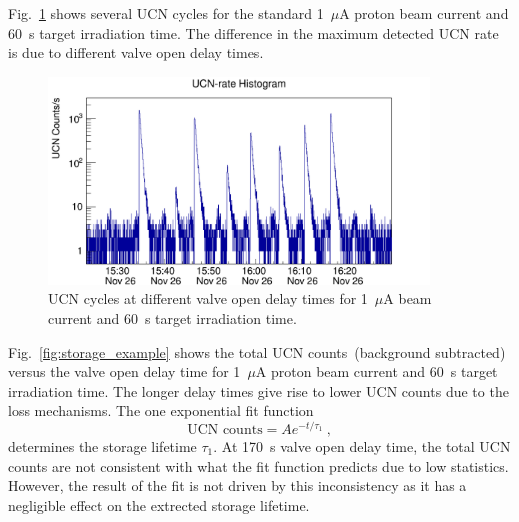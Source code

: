 Fig.~\ref{fig:storage_all} shows several UCN cycles for the standard
1~$\mu$A proton beam current and 60~s target irradiation time. The
difference in the maximum detected UCN rate is due to different valve
open delay times.
\begin{figure}[h!]
  \centering
  \includegraphics[width=0.9\textwidth]{storagetime_all.png}
  \caption{UCN cycles at different valve open delay times for 1~$\mu$A
    beam current and 60~s target irradiation time.}
  \label{fig:storage_all}
\end{figure}
Fig.~\ref{fig:storage_example} shows the total UCN counts~(background
subtracted) versus the valve open delay time for 1~$\mu$A proton beam
current and 60~s target irradiation time. The longer delay times give
rise to lower UCN counts due to the loss mechanisms. The one
exponential fit function
\begin{equation}
\text{UCN counts} = A e^{-t/\tau_1}~,
\end{equation}
determines the storage lifetime $\tau_1$. At 170~s valve open delay
time, the total UCN counts are not consistent with what the fit
function predicts due to low statistics. However, the result of the
fit is not driven by this inconsistency as it has a negligible effect
on the extrected storage lifetime.

